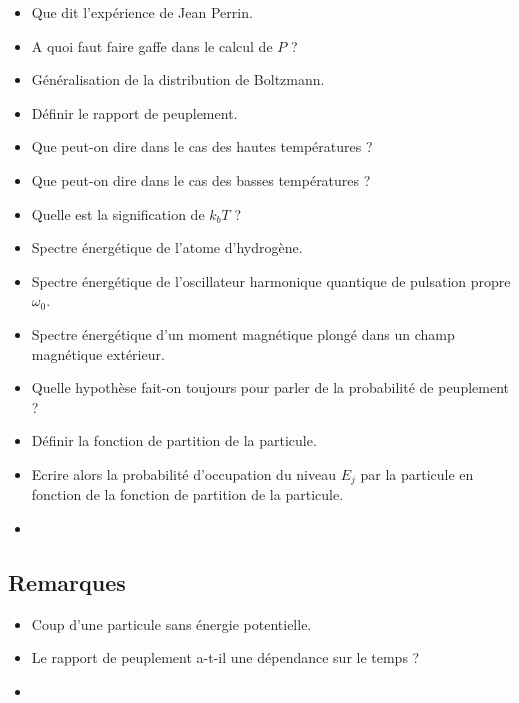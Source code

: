 \documentclass[a4paper, 11pt, hidelinks]{article}
\begin{document}
\begin{itemize}
    \item Que dit l'expérience de Jean Perrin. \cite{Chapitre24}
    \item A quoi faut faire gaffe dans le calcul de $P$ ? \cite{Chapitre24}
    \item Généralisation de la distribution de Boltzmann. \cite{Chapitre24}
    \item Définir le rapport de peuplement. \cite{Chapitre24}
    \item Que peut-on dire dans le cas des hautes températures ? \cite{Chapitre24}
    \item Que peut-on dire dans le cas des basses températures ? \cite{Chapitre24}
    \item Quelle est la signification de $k_b T$ ? \cite{Chapitre24}
    \item Spectre énergétique de l'atome d'hydrogène. \cite{Chapitre24}
    \item Spectre énergétique de l'oscillateur harmonique quantique de pulsation propre $\omega_0$. \cite{Chapitre24}
    \item Spectre énergétique d'un moment magnétique plongé dans un champ magnétique extérieur. \cite{Chapitre24}
    \item Quelle hypothèse fait-on toujours pour parler de la probabilité de peuplement ? \cite{Chapitre24}
    \item Définir la fonction de partition de la particule. \cite{Chapitre24}
    \item Ecrire alors la probabilité d'occupation du niveau $E_j$ par la particule en fonction de la fonction de partition de la particule. \cite{Chapitre24}
    \item 
\end{itemize}


\subsection{Remarques}



\begin{itemize}
    \item Coup d'une particule sans énergie potentielle. 
    \item Le rapport de peuplement a-t-il une dépendance sur le temps ? 
    \item 
\end{itemize}
\end{document}
